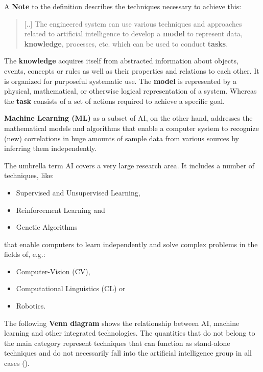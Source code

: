 \documentclass [oneside,10pt,a4paper,ngerman,BCOR10mm,headsepline,parindent,final]{scrartcl}
\providecommand{\tightlist}{%
      \setlength{\itemsep}{0pt}\setlength{\parskip}{0pt}}
\begin{document}
A \textbf{Note} to the definition describes the techniques necessary to
achieve this:

\begin{quote}
{[}..{]} The engineered system can use various techniques and approaches
related to artificial intelligence to develop a \textbf{model} to
represent data, \textbf{knowledge}, processes, etc. which can be used to
conduct \textbf{tasks}.
\end{quote}

The \textbf{knowledge} acquires itself from abstracted information about
objects, events, concepts or rules as well as their properties and
relations to each other. It is organized for purposeful systematic use.
The \textbf{model} is represented by a physical, mathematical, or
otherwise logical representation of a system. Whereas the \textbf{task}
consists of a set of actions required to achieve a specific goal.

\textbf{Machine Learning (ML)} as a subset of AI, on the other hand,
addresses the mathematical models and algorithms that enable a computer
system to recognize (new) correlations in huge amounts of sample data
from various sources by inferring them independently.

The umbrella term AI covers a very large research area. It includes a
number of techniques, like:

\begin{itemize}
\tightlist
\item
  Supervised and Unsupervised Learning,
\item
  Reinforcement Learning and
\item
  Genetic Algorithms
\end{itemize}

that enable computers to learn independently and solve complex problems
in the fields of, e.g.:

\begin{itemize}
\tightlist
\item
  Computer-Vision (CV),
\item
  Computational Linguistics (CL) or
\item
  Robotics.
\end{itemize}

The following \textbf{Venn diagram} shows the relationship between AI,
machine learning and other integrated technologies. The quantities that
do not belong to the main category represent techniques that can
function as stand-alone techniques and do not necessarily fall into the
artificial intelligence group in all cases (\cite{AI_beverages_2019}).
\end{document}
